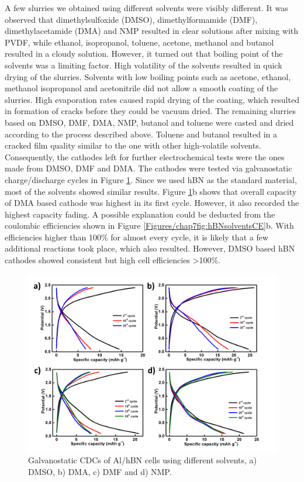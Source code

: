 A few slurries we obtained using different solvents were visibly different. It was observed that dimethylsulfoxide (DMSO), dimethylformamide (DMF), dimethylacetamide (DMA) and NMP resulted in clear solutions after mixing with PVDF, while ethanol, isopropanol, toluene, acetone, methanol and butanol resulted in a cloudy solution. 
However, it turned out that boiling point of the solvents was a limiting factor. High volatility of the solvents resulted in quick drying of the slurries. Solvents with low boiling points such as acetone, ethanol, methanol isopropanol and acetonitrile did not allow a smooth coating of the slurries. High evaporation rates caused rapid drying of the coating, which resulted in formation of cracks before they could be vacuum dried.
The remaining slurries based on DMSO, DMF, DMA, NMP, butanol and toluene were casted and dried according to the process described above. Toluene and butanol resulted in a cracked film quality similar to the one with other high-volatile solvents. Consequently, the cathodes left for further electrochemical tests were the ones made from DMSO, DMF and DMA.
The cathodes were tested via galvanostatic charge/discharge cycles in Figure \ref{Figures/chap7fig:hBNsolvents}. Since we used hBN as the standard material, most of the solvents showed similar results. Figure \ref{Figures/chap7fig:hBNsolvents}b  shows that overall capacity of DMA based cathode was highest in its first cycle. However, it also recorded the highest capacity fading. A possible explanation could be deducted from the coulombic efficiencies shown in Figure \ref{Figures/chap7fig:hBNsolventsCE}b. With efficiencies higher than 100\% for almost every cycle, it is likely that a few additional reactions took place, which also resulted. However, DMSO based hBN cathodes showed consistent but high cell efficiencies >100\%. 
\begin{figure}[tbh!]
\centering
\includegraphics[width=\textwidth]{Figures/chap7fig/hBNsolvents}
\caption{Galvanostatic CDCs of Al/hBN cells using different solvents, a) DMSO, b) DMA, c) DMF and d) NMP.}
\label{Figures/chap7fig:hBNsolvents}
\end{figure}
